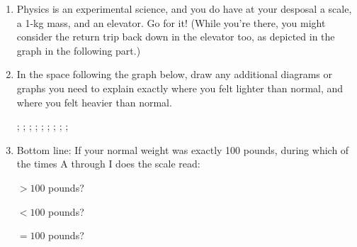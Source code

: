\begin{enumerate}[labparts]

\item Physics is an experimental science, and you do have at your desposal a scale, a 1-kg mass, and an elevator.  Go for it!  (While you're there, you might consider the return trip back down in the elevator too, as depicted in the graph in the following part.)

\item In the space following the graph below, draw any additional diagrams or graphs you need to explain exactly where you felt lighter than normal, and where you felt heavier than normal.

\hspace{0.2in}
\begin{lab_axis}[lab_noticks_1quad,
	height = {1.5in}, width = {4in},
	ymax=1.1, xmax=2.0,
	xlabel={Time},
	ylabel={Position},
	xtick={0.1,0.3,0.5,0.7,0.9, 1.1, 1.3, 1.5, 1.7},
	xticklabels={A,B,C,D,E,F,G,H,I},
	]
;
;
;
;
;
;
;
;
;
\end{lab_axis}

\vfill

\item Bottom line:  If your normal weight was exactly 100 pounds, during which of the times A through I does the scale read:

\hspace{0.5in} $> 100$ pounds?

\hspace{0.5in} $< 100$ pounds?

\hspace{0.5in} $= 100$ pounds?

\end{enumerate}


